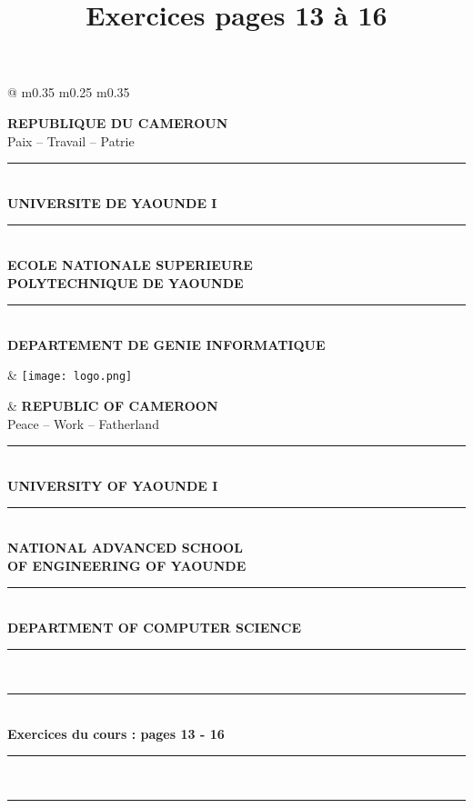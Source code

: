 \documentclass[12pt,a4paper]{article}
\title{Exercices pages 13 à 16}
\author{}
\date{}
\newcommand{\HRule}{\rule{\linewidth}{1pt}}
\newcommand{\DoubleHRule}{\rule{\linewidth}{1.5pt}\\[-0.3em]\rule{\linewidth}{0.8pt}}
\begin{document}
	\thispagestyle{empty} %
	
	\begin{tcolorbox}[
		colback=blue!5,
		colframe=blue!50,
		boxrule=0.8pt,
		arc=4mm,
		left=4mm, right=4mm, top=2mm, bottom=2mm
		]
		
		\begin{tabular*}{\textwidth}{@{\extracolsep{\fill}} m{0.35\textwidth} m{0.25\textwidth} m{0.35\textwidth} }
			
			\centering
			\textbf{REPUBLIQUE DU CAMEROUN}\\
			Paix -- Travail -- Patrie\\
			\HRule \\[0.3em]
			\textbf{UNIVERSITE DE YAOUNDE I}\\
			\HRule \\[0.3em]
			\textbf{ECOLE NATIONALE SUPERIEURE\\POLYTECHNIQUE DE YAOUNDE}\\
			\HRule \\[0.3em]
			\textbf{DEPARTEMENT DE GENIE INFORMATIQUE}
			
			&
			\centering
			\texttt{[image: logo.png]}
			
			&
			\centering
			\textbf{REPUBLIC OF CAMEROON}\\
			Peace -- Work -- Fatherland\\
			\HRule \\[0.3em]
			\textbf{UNIVERSITY OF YAOUNDE I}\\
			\HRule \\[0.3em]
			\textbf{NATIONAL ADVANCED SCHOOL\\OF ENGINEERING OF YAOUNDE}\\
			\HRule \\[0.3em]
			\textbf{DEPARTMENT OF COMPUTER SCIENCE}
			
		\end{tabular*}
	\end{tcolorbox}
	
	\vspace{1.2cm}
	
	\begin{center}
		\DoubleHRule \\[1em]
		{\huge \bfseries Exercices du cours : pages 13 - 16 }\\[1em]
		\DoubleHRule
	\end{center}
	
\end{document}
